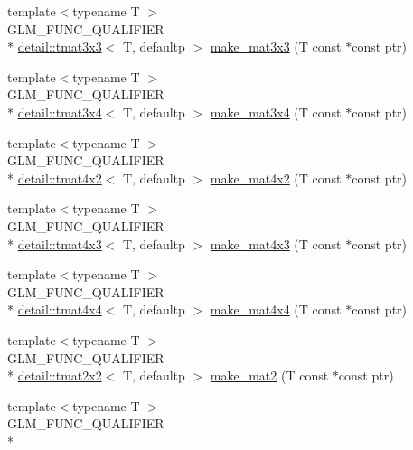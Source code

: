 \begin{DoxyCompactItemize}
{\footnotesize template$<$typename T $>$ }\\G\-L\-M\-\_\-\-F\-U\-N\-C\-\_\-\-Q\-U\-A\-L\-I\-F\-I\-E\-R \\*
\hyperlink{structglm_1_1detail_1_1tmat3x3}{detail\-::tmat3x3}$<$ T, defaultp $>$ \hyperlink{group__gtc__type__ptr_gaf8ba0a0a523423ae1149a1c2d90eb337}{make\-\_\-mat3x3} (T const $\ast$const ptr)
\item 
{\footnotesize template$<$typename T $>$ }\\G\-L\-M\-\_\-\-F\-U\-N\-C\-\_\-\-Q\-U\-A\-L\-I\-F\-I\-E\-R \\*
\hyperlink{structglm_1_1detail_1_1tmat3x4}{detail\-::tmat3x4}$<$ T, defaultp $>$ \hyperlink{group__gtc__type__ptr_gaa0c07ac459a5e16374aa12e3b35ee043}{make\-\_\-mat3x4} (T const $\ast$const ptr)
\item 
{\footnotesize template$<$typename T $>$ }\\G\-L\-M\-\_\-\-F\-U\-N\-C\-\_\-\-Q\-U\-A\-L\-I\-F\-I\-E\-R \\*
\hyperlink{structglm_1_1detail_1_1tmat4x2}{detail\-::tmat4x2}$<$ T, defaultp $>$ \hyperlink{group__gtc__type__ptr_gae4ad99adfe4fb195a192712a71de901d}{make\-\_\-mat4x2} (T const $\ast$const ptr)
\item 
{\footnotesize template$<$typename T $>$ }\\G\-L\-M\-\_\-\-F\-U\-N\-C\-\_\-\-Q\-U\-A\-L\-I\-F\-I\-E\-R \\*
\hyperlink{structglm_1_1detail_1_1tmat4x3}{detail\-::tmat4x3}$<$ T, defaultp $>$ \hyperlink{group__gtc__type__ptr_ga37ec66362c22d86ad2ee11930b638c4a}{make\-\_\-mat4x3} (T const $\ast$const ptr)
\item 
{\footnotesize template$<$typename T $>$ }\\G\-L\-M\-\_\-\-F\-U\-N\-C\-\_\-\-Q\-U\-A\-L\-I\-F\-I\-E\-R \\*
\hyperlink{structglm_1_1detail_1_1tmat4x4}{detail\-::tmat4x4}$<$ T, defaultp $>$ \hyperlink{group__gtc__type__ptr_ga4b13ff6840a66d032724a9a1db50f704}{make\-\_\-mat4x4} (T const $\ast$const ptr)
\item 
{\footnotesize template$<$typename T $>$ }\\G\-L\-M\-\_\-\-F\-U\-N\-C\-\_\-\-Q\-U\-A\-L\-I\-F\-I\-E\-R \\*
\hyperlink{structglm_1_1detail_1_1tmat2x2}{detail\-::tmat2x2}$<$ T, defaultp $>$ \hyperlink{group__gtc__type__ptr_ga903422b2c346cbaccad3153a5a1f404c}{make\-\_\-mat2} (T const $\ast$const ptr)
\item 
{\footnotesize template$<$typename T $>$ }\\G\-L\-M\-\_\-\-F\-U\-N\-C\-\_\-\-Q\-U\-A\-L\-I\-F\-I\-E\-R \\*

\end{DoxyCompactItemize}
